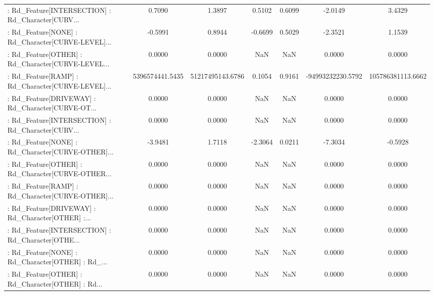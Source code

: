 \begin{longtable}{p{4cm}cccccc}
 : Rd\_Feature[INTERSECTION] : Rd\_Character[CURV... &            0.7090 &            1.3897 &  0.5102 &       0.6099 &            -2.0149 &            3.4329 \\
 : Rd\_Feature[NONE] : Rd\_Character[CURVE-LEVEL]... &           -0.5991 &            0.8944 & -0.6699 &       0.5029 &            -2.3521 &            1.1539 \\
 : Rd\_Feature[OTHER] : Rd\_Character[CURVE-LEVEL... &            0.0000 &            0.0000 &     NaN &          NaN &             0.0000 &            0.0000 \\
 : Rd\_Feature[RAMP] : Rd\_Character[CURVE-LEVEL]... &   5396574441.5435 &  51217495143.6786 &  0.1054 &       0.9161 &  -94993232230.5792 & 105786381113.6662 \\
 : Rd\_Feature[DRIVEWAY] : Rd\_Character[CURVE-OT... &            0.0000 &            0.0000 &     NaN &          NaN &             0.0000 &            0.0000 \\
 : Rd\_Feature[INTERSECTION] : Rd\_Character[CURV... &            0.0000 &            0.0000 &     NaN &          NaN &             0.0000 &            0.0000 \\
 : Rd\_Feature[NONE] : Rd\_Character[CURVE-OTHER]... &           -3.9481 &            1.7118 & -2.3064 &       0.0211 &            -7.3034 &           -0.5928 \\
 : Rd\_Feature[OTHER] : Rd\_Character[CURVE-OTHER... &            0.0000 &            0.0000 &     NaN &          NaN &             0.0000 &            0.0000 \\
 : Rd\_Feature[RAMP] : Rd\_Character[CURVE-OTHER]... &            0.0000 &            0.0000 &     NaN &          NaN &             0.0000 &            0.0000 \\
 : Rd\_Feature[DRIVEWAY] : Rd\_Character[OTHER] :... &            0.0000 &            0.0000 &     NaN &          NaN &             0.0000 &            0.0000 \\
 : Rd\_Feature[INTERSECTION] : Rd\_Character[OTHE... &            0.0000 &            0.0000 &     NaN &          NaN &             0.0000 &            0.0000 \\
 : Rd\_Feature[NONE] : Rd\_Character[OTHER] : Rd\_... &            0.0000 &            0.0000 &     NaN &          NaN &             0.0000 &            0.0000 \\
 : Rd\_Feature[OTHER] : Rd\_Character[OTHER] : Rd... &            0.0000 &            0.0000 &     NaN &          NaN &             0.0000 &            0.0000 \\

\end{longtable}
